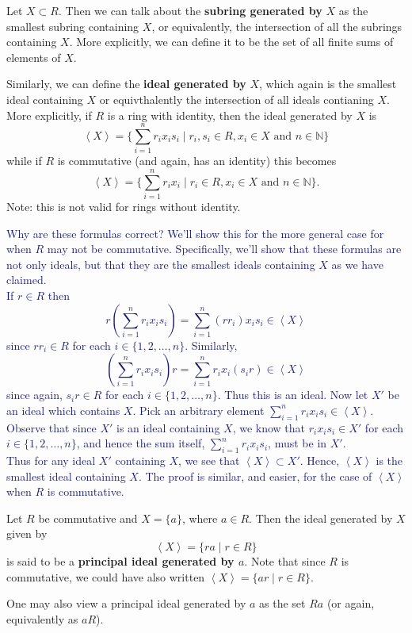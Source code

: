\documentclass[12pt,letterpaper]{algebra_book}
\theoremstyle{definition}
\begin{document}
    Let $X \subset R$. Then we can talk about the \textbf{subring
    generated by} $X$ as the smallest subring containing $X$, or
    equivalently, the intersection of all the subrings containing
    $X$. More explicitly, we can define it to be the set of all
    finite sums of elements of $X$. 

    Similarly, we can define the \textbf{ideal generated by}
    $X$, which again is the smallest ideal containing $X$ or
    equivthalently the intersection of all ideals contianing $X$. 
    More explicitly, if $R$ is a ring with identity, then the ideal
    generated by $X$ is 
    \[
        \left< X \right> = \Big\{\sum_{i=1}^{n}r_ix_is_i \mid r_i, s_i \in R, x_i \in X \text{ and } n \in \mathbb{N}\Big\}
    \]
    while if $R$ is commutative (and again, has an identity) this becomes 
    \[
        \left< X \right>= \Big\{\sum_{i=1}^{n}r_ix_i \mid r_i \in R, x_i \in X \text{ and } n \in \mathbb{N}\Big\}.
    \]
    Note: this is not valid for rings without identity. 

    \textcolor{MidnightBlue}{Why are these formulas correct? We'll
    show this for the more general case for when $R$ may not be
    commutative. Specifically, we'll show that these formulas are
    not only ideals, but that they are the smallest ideals
    containing $X$ as we have claimed. 
    \\
    \indent If $r \in R$ then 
    \[
        r\left( \sum_{i=1}^{n}r_ix_is_i \right) = \sum_{i=1}^{n}(rr_i)x_is_i \in \left< X \right> 
    \]
    since $rr_i \in R$ for each $i \in \{1, 2, \dots, n\}$.
    Similarly, 
    \[
        \left( \sum_{i=1}^{n}r_ix_is_i \right)r = \sum_{i=1}^{n}r_ix_i(s_ir) \in \left< X \right> 
    \]
    since again, $s_ir \in R$ for each $i \in \{1, 2, \dots, n\}$.
    Thus this is an ideal. Now let $X'$ be an ideal which contains
    $X$. Pick an arbitrary element $\displaystyle \sum_{i=1}^{n}r_ix_is_i \in
    \left< X \right>$. Observe that since $X'$ is an ideal
    containing $X$, we know that $r_ix_is_i \in X'$ for each $i
    \in \{1, 2, \dots, n\}$, and hence the sum itself,
    $\sum_{i=1}^{n}r_ix_is_i$, must be in $X'$. 
    \\
    \indent Thus for any ideal $X'$ containing $X$, we see that $\left< X
    \right> \subset X'$. Hence, $\left< X \right>$ is the smallest
    ideal containing $X$. The proof is similar, and easier, for
    the case of $\left< X \right>$ when $R$ is commutative.
    }

    \begin{definition}
        Let $R$ be commutative and $X = \{a\}$, where $a \in R$.
        Then the ideal generated by $X$ given by 
        \[
            \left< X \right> = \{ra \mid r \in R\}
        \]
        is said to be a \textbf{principal ideal generated by $a$}.
        Note that since $R$ is commutative, we could have also
        written $\left< X \right> = \{ar \mid r \in R\}$.

        One may also view a principal ideal generated by $a$ as
        the set $Ra$ (or again, equivalently as $aR$).
    \end{definition}
\end{document}
